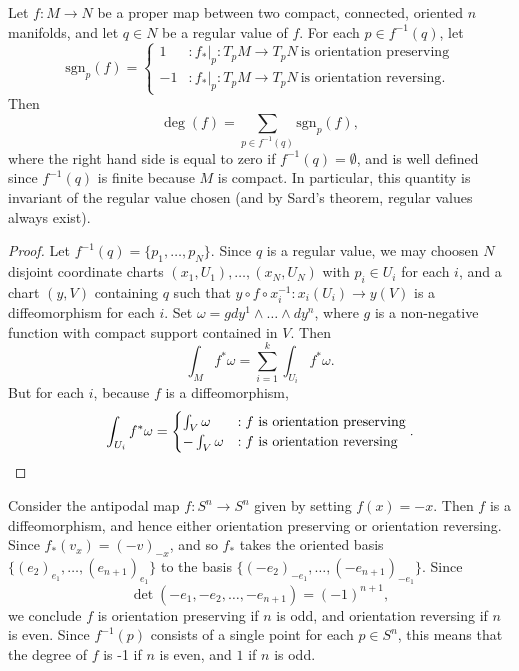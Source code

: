 \begin{theorem}
    Let $f: M \to N$ be a proper map between two compact, connected, oriented $n$ manifolds, and let $q \in N$ be a regular value of $f$. For each $p \in f^{-1}(q)$, let
    \[ \text{sgn}_p(f) = \begin{cases} 1 &: f_*|_p: T_p M \to T_p N\ \text{is orientation preserving} \\ -1 &: f_*|_p: T_p M \to T_p N\ \text{is orientation reversing}. \end{cases} \]
    Then
    \[ \deg(f) = \sum_{p \in f^{-1}(q)} \text{sgn}_p(f), \]
    where the right hand side is equal to zero if $f^{-1}(q) = \emptyset$, and is well defined since $f^{-1}(q)$ is finite because $M$ is compact. In particular, this quantity is invariant of the regular value chosen (and by Sard's theorem, regular values always exist).
\end{theorem}
\begin{proof}
    Let $f^{-1}(q) = \{ p_1, \dots, p_N \}$. Since $q$ is a regular value, we may choosen $N$ disjoint coordinate charts $(x_1,U_1), \dots, (x_N,U_N)$ with $p_i \in U_i$ for each $i$, and a chart $(y,V)$ containing $q$ such that $y \circ f \circ x_i^{-1}: x_i(U_i) \to y(V)$ is a diffeomorphism for each $i$. Set $\omega = g dy^1 \wedge \dots \wedge dy^n$, where $g$ is a non-negative function with compact support contained in $V$. Then
    \[ \int_M f^* \omega = \sum_{i = 1}^k \int_{U_i} f^*\omega. \]
    But for each $i$, because $f$ is a diffeomorphism,
    \[ \int_{U_i} f^* \omega = \begin{cases} \int_V \omega &: \text{$f$ is orientation preserving} \\ - \int_V \omega &: \text{$f$ is orientation reversing} \end{cases}. \qedhere \]
\end{proof}

\begin{example}
    Consider the antipodal map $f: S^n \to S^n$ given by setting $f(x) = -x$. Then $f$ is a diffeomorphism, and hence either orientation preserving or orientation reversing. Since $f_*(v_x) = (-v)_{-x}$, and so $f_*$ takes the oriented basis $\{ (e_2)_{e_1}, \dots, (e_{n+1})_{e_1} \}$ to the basis $\{ (-e_2)_{-e_1}, \dots, (-e_{n+1})_{-e_1} \}$. Since
    \[ \det(-e_1,-e_2, \dots, -e_{n+1}) = (-1)^{n+1}, \]
    we conclude $f$ is orientation preserving if $n$ is odd, and orientation reversing if $n$ is even. Since $f^{-1}(p)$ consists of a single point for each $p \in S^n$, this means that the degree of $f$ is -1 if $n$ is even, and $1$ if $n$ is odd.
\end{example}

